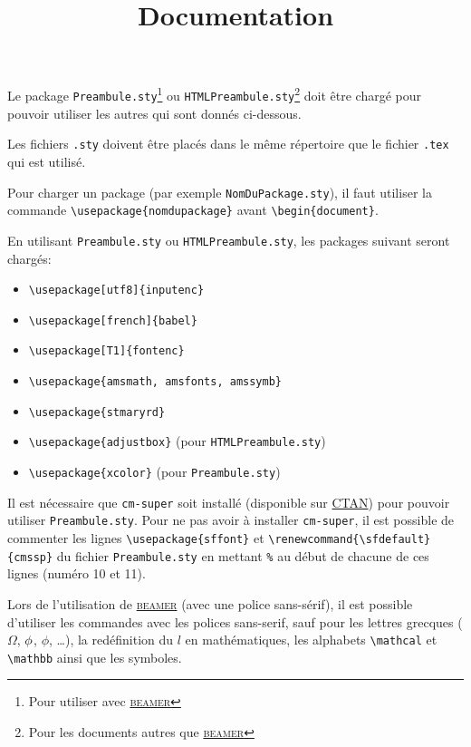 \documentclass[a4paper,12pt]{article}
\title{Documentation}
\author{}
\date{}
\begin{document}
\maketitle
Le package \texttt{Preambule.sty}\footnote{Pour utiliser avec \href{https://ctan.org/pkg/beamer}{\color{black}\textsc{beamer}}} ou \texttt{HTMLPreambule.sty}\footnote{Pour les documents autres que \href{https://ctan.org/pkg/beamer}{\color{black}\textsc{beamer}}} doit être chargé pour pouvoir utiliser les autres qui sont donnés ci-dessous.

Les fichiers \Verb?.sty? doivent être placés dans le même répertoire que le fichier \Verb?.tex? qui est utilisé.

Pour charger un package (par exemple \Verb?NomDuPackage.sty?), il faut utiliser la commande \Verb?\usepackage{nomdupackage}? avant \Verb?\begin{document}?.

\vspace{0.5cm}

En utilisant \texttt{Preambule.sty} ou \texttt{HTMLPreambule.sty}, les packages suivant seront chargés:
\begin{itemize}
    \renewcommand{\labelitemi}{$\to$}
    \item \Verb?\usepackage[utf8]{inputenc}?
    \item \Verb?\usepackage[french]{babel}?
    \item \Verb?\usepackage[T1]{fontenc}?
    \item \Verb?\usepackage{amsmath, amsfonts, amssymb}?
    \item \Verb?\usepackage{stmaryrd}?
    \item \Verb?\usepackage{adjustbox}? (pour \texttt{HTMLPreambule.sty})
    \item \Verb?\usepackage{xcolor}? (pour \texttt{Preambule.sty})
\end{itemize}

\vspace{0.5cm}
Il est nécessaire que \texttt{cm-super} soit installé (disponible sur \href{https://ctan.org/pkg/cm-super}{CTAN}) pour pouvoir utiliser \texttt{Preambule.sty}. Pour ne pas avoir à installer \texttt{cm-super}, il est possible de commenter les lignes \Verb?\usepackage{sffont}? et \Verb?\renewcommand{\sfdefault}{cmssp}? du fichier \texttt{Preambule.sty} en mettant \Verb?%

Lors de l'utilisation de \href{https://ctan.org/pkg/beamer}{\color{black}\textsc{beamer}} (avec une police sans-sérif), il est possible d'utiliser les commandes avec les polices sans-serif, sauf pour les lettres grecques ($\Omega$, $\phi$, $\phi$, \dots), la redéfinition du $l$ en mathématiques, les alphabets \Verb?\mathcal? et \Verb?\mathbb? ainsi que les symboles.


\end{document}
\end{document}
